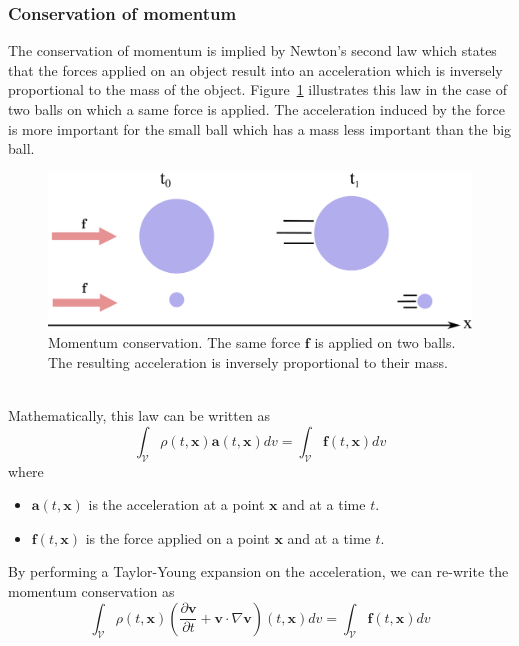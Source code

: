 \subsubsection{Conservation of momentum}
\label{subsubsec:starMechanics_momentumConservation}
The conservation of momentum is implied by Newton's second law which states that the forces applied on an object result into an acceleration which is inversely proportional to the mass of the object.
Figure~\ref{fig:momentumConservation} illustrates this law in the case of two balls on which a same force is applied.
The acceleration induced by the force is more important for the small ball which has a mass less important than the big ball.
\begin{figure}[!h]
\centering
\includegraphics[width=\linewidth]{images/continuum_mechanics/momentumConservation.png}
\caption[STAR mechanics: Momentum conservation]{\label{fig:momentumConservation} Momentum conservation. The same force $\mathbf{f}$ is applied on two balls. The resulting acceleration is inversely proportional to their mass.}
\end{figure}
\\
Mathematically, this law can be written as
\begin{equation}
\displaystyle 
\int_{\mathcal{V}} 
\rho(t,\mathbf{x})\mathbf{a}(t,\mathbf{x}) dv 
= 
\int_{\mathcal{V}} \mathbf{f}(t,\mathbf{x}) dv
\end{equation}
where
\begin{itemize}
	\item $\mathbf{a}(t,\mathbf{x})$ is the acceleration at a point $\mathbf{x}$ and at a time $t$.
		\item $\mathbf{f}(t,\mathbf{x})$ is the force applied on a point $\mathbf{x}$ and at a time $t$.
\end{itemize}
By performing a Taylor-Young expansion on the acceleration, we can re-write the momentum conservation as
\begin{equation}
\label{eq:momentumConservation}
\displaystyle 
\int_{\mathcal{V}} 
\rho(t,\mathbf{x}) \left( \frac{\partial\mathbf{v}}{\partial t} + \mathbf{v} \cdot \nabla \mathbf{v} \right)(t,\mathbf{x}) dv 
= 
\int_{\mathcal{V}} \mathbf{f}(t,\mathbf{x}) dv
\end{equation}
